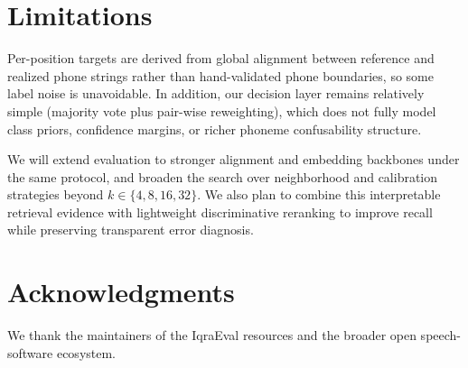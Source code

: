 \documentclass[11pt]{article}
\begin{document}
\section*{Limitations}

Per-position targets are derived from global alignment between reference and realized phone strings rather than hand-validated phone boundaries, so some label noise is unavoidable. In addition, our decision layer remains relatively simple (majority vote plus pair-wise reweighting), which does not fully model class priors, confidence margins, or richer phoneme confusability structure.

We will extend evaluation to stronger alignment and embedding backbones under the same protocol, and broaden the search over neighborhood and calibration strategies beyond $k{\in}\{4,8,16,32\}$. We also plan to combine this interpretable retrieval evidence with lightweight discriminative reranking to improve recall while preserving transparent error diagnosis.

\section*{Acknowledgments}

We thank the maintainers of the IqraEval resources and the broader open speech-software ecosystem.

%

\end{document}
